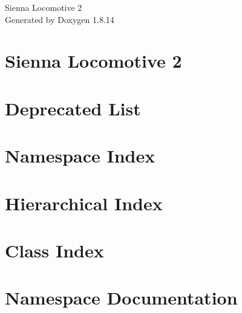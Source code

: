 \documentclass[twoside]{book}
\newcommand{\+}{\discretionary{\mbox{\scriptsize$\hookleftarrow$}}{}{}}
\newcommand{\clearemptydoublepage}{%
  \newpage{\pagestyle{empty}\cleardoublepage}%
}
\begin{document}
\hypersetup{pageanchor=false,
             bookmarksnumbered=true,
             pdfencoding=unicode
            }
\begin{titlepage}
\vspace*{7cm}
\begin{center}%
{\Large Sienna Locomotive 2 }\\
\vspace*{1cm}
{\large Generated by Doxygen 1.8.14}\\
\end{center}
\end{titlepage}
\clearemptydoublepage
{}
\tableofcontents
\clearemptydoublepage
{}
\hypersetup{pageanchor=true}

\chapter{Sienna Locomotive 2}
\label{index}\hypertarget{index}{}
\chapter{Deprecated List}
\label{deprecated}

\chapter{Namespace Index}

\chapter{Hierarchical Index}

\chapter{Class Index}

\chapter{Namespace Documentation}














\end{document}
